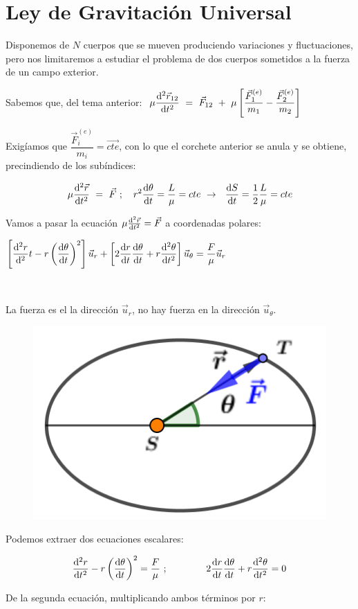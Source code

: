 \section{Ley de Gravitación Universal}

Disponemos de $N$ cuerpos que se mueven produciendo variaciones y fluctuaciones, pero nos limitaremos a estudiar el problema de dos cuerpos sometidos a la fuerza de un campo exterior.

Sabemos que, del tema anterior: $\ \displaystyle \mu \dv[2]{\vec r_{12}}{t} \ = \ \vec F_{12} \ + \ \mu \left[ \dfrac {\vec F_1^{(e)}}{m_1}-\dfrac {\vec F_2^{(e)}}{m_2} \right]$

Exigíamos que $\dfrac {\vec F_i^{(e)}}{m_i}=\overrightarrow{cte}$, con lo que el corchete anterior se anula y se obtiene, precindiendo de los subíndices:


$$  \displaystyle \mu \dv[2]{\vec r}{t} \ = \ \vec F\ ; \quad r^2 \dv{\theta}{t}=\dfrac L \mu=cte  \ \to \ \  \dv{S}{t}=\dfrac 1 2 \dfrac L \mu = cte$$


Vamos a pasar la ecuación $\mu \dv[2]{\vec r}{t}=\vec F$ a coordenadas polares:

$\displaystyle \left[ \dv[2]r{}{t}- r\left(\dv{\theta}{t} \right)^2\right]\vec u_r + \left[ 2 \dv{r}{t}\dv{\theta}{t}+r\dv[2]{\theta}{t} \right]\vec u_\theta = \dfrac F \mu \vec u_r$

\vspace{3mm} %
\begin{multicols}{2}
$\quad$

La fuerza es el la dirección $\vec u_r$, no hay fuerza en la dirección $\vec u_\theta$.
\begin{figure}[H]
	\centering
	\includegraphics[width=.3\textwidth]{imagenes/imagenes14/T14IM04.png}
\end{figure}
\end{multicols}

Podemos extraer dos ecuaciones escalares:

$$\displaystyle \dv[2]{r}{t}- r\left(\dv{\theta}{t} \right)^2 =\dfrac F \mu \ ; \qquad  \qquad  2 \dv{r}{t}\dv{\theta}{t}+r\dv[2]{\theta}{t}=0 $$

De la segunda ecuación, multiplicando ambos términos por $r$:

